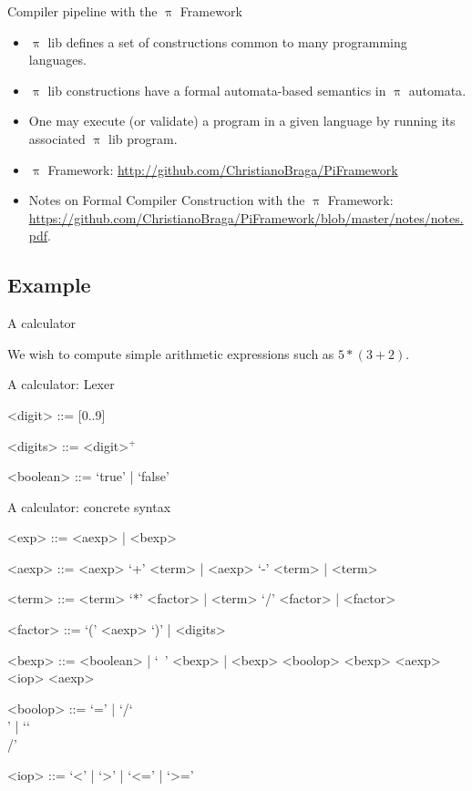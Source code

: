 \documentclass{beamer}
\newcommand{\BS}{\char`\\}
\begin{document}
\begin{frame}[shrink]{Compiler pipeline with the {\color{red}$\uppi$ Framework}}
\begin{itemize}
\item {\color{red}$\uppi$ lib} defines a set of constructions common to many programming languages.
\item {\color{red}$\uppi$ lib} constructions have a formal automata-based semantics in {\color{red}$\uppi$ automata}.
\item One may execute (or validate) a program in a given language by running its associated {\color{red}$\uppi$ lib} program. 
\item {\color{red}$\uppi$ Framework}: \url{http://github.com/ChristianoBraga/PiFramework}
\item Notes on Formal Compiler Construction with the {\color{red}$\uppi$ Framework}: \url{https://github.com/ChristianoBraga/PiFramework/blob/master/notes/notes.pdf}.
\end{itemize}

\end{frame}

\subsection{Example}

\begin{frame}[fragile]{A calculator}

We wish to compute simple arithmetic expressions such as $ 5 * (3 + 2)$.

\end{frame}


\begin{frame}[fragile]{A calculator: Lexer}
\begin{grammar}
<digit> ::= [0..9]

<digits> ::= <digit>$^+$

<boolean> ::= `true' | `false'
\end{grammar}
\end{frame}


\begin{frame}[fragile]{A calculator: concrete syntax}
\begin{grammar}
<exp> ::= <aexp> | <bexp>

<aexp> ::= <aexp> `+' <term> | <aexp> `-' <term> | <term>

<term> ::= <term> `*' <factor> | <term> `/' <factor> | <factor>

<factor> ::= `(' <aexp> `)'  | <digits>

<bexp> ::= <boolean> | `~' <bexp> | <bexp> <boolop> <bexp> 
\alt <aexp> <iop> <aexp>

<boolop> ::= `=' | `/\BS' | `\BS/'

<iop> ::= `<' | `>' | `<=' | `>=' 
\end{grammar}
\end{frame}
\end{document}
